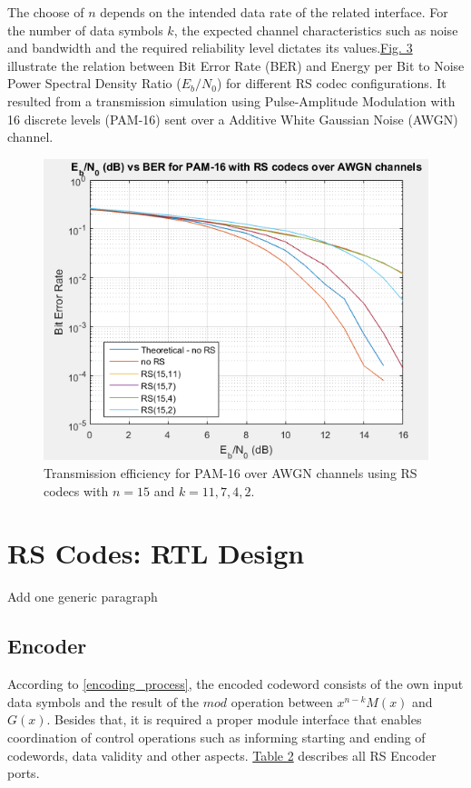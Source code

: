\documentclass[conference]{IEEEtran}
\begin{document}
The choose of $n$ depends on the intended data rate of the related interface. For the number of data symbols $k$, the expected channel characteristics such as noise and bandwidth and the required reliability level dictates its values.\hyperref[fig:fig31]{Fig. 3} illustrate the relation between Bit Error Rate (BER) and Energy per Bit to Noise Power Spectral Density Ratio ($E_{b}/N_{0}$) for  different RS codec configurations. It resulted from a transmission simulation using Pulse-Amplitude Modulation with 16 discrete levels (PAM-16) sent over a Additive White Gaussian Noise (AWGN) channel. 


\begin{figure}[!hbt]
  \includegraphics[width=\linewidth]{figures/fig_13.png}
  \caption{Transmission efficiency for PAM-16 over AWGN channels using RS codecs with $n = 15$ and $k = 11, 7, 4, 2.$}
  \label{fig:fig31}
\end{figure}  

\section{RS Codes: RTL Design}

Add one generic paragraph
\subsection{Encoder}

According to \ref{encoding_process}, the encoded codeword consists of the own input data symbols and the result of the $mod$ operation between $x^{n - k}M(x)$ and $G(x)$. Besides that, it is required a proper module interface that enables coordination of control operations such as informing starting and ending of codewords, data validity and other aspects. \hyperref[tab:t2]{Table 2} describes all RS Encoder ports. 
\end{document}
